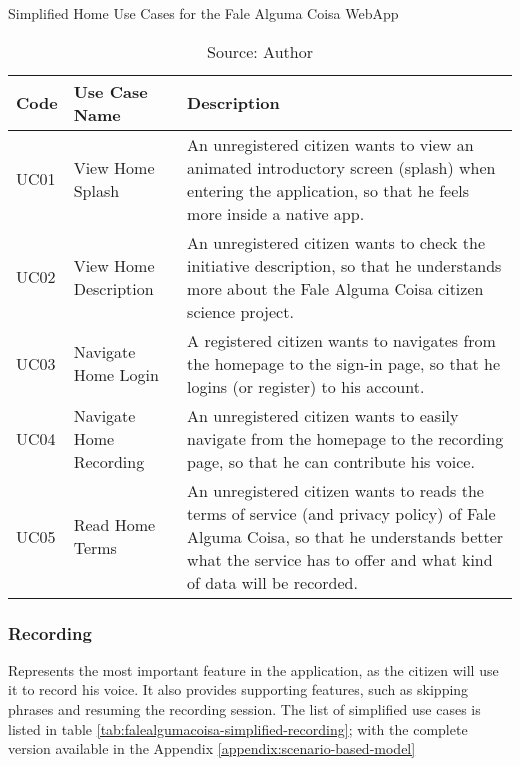 \begin{table}[h]
\caption{Simplified Home Use Cases for the Fale Alguma Coisa WebApp}
\label{tab:falealgumacoisa-simplified-home}
\centering
\begin{tabular}{|p{1cm}|p{3cm}|p{10cm}|}
\hline
    Code & Use Case Name & Description \\ \hline
    UC01 & View Home Splash & An unregistered citizen wants to view an animated introductory screen (splash) when entering the application, so that he feels more inside a native app. \\ \hline
    UC02 & View Home Description & An unregistered citizen wants to check the initiative description, so that he understands more about the Fale Alguma Coisa citizen science project. \\ \hline
    UC03 & Navigate Home Login & A registered citizen wants to navigates from the homepage to the sign-in page, so that he logins (or register) to his account. \\ \hline
    UC04 & Navigate Home Recording & An unregistered citizen wants to easily navigate from the homepage to the recording page, so that he can contribute his voice. \\ \hline
    UC05 & Read Home Terms & An unregistered citizen wants to reads the terms of service (and privacy policy) of Fale Alguma Coisa, so that he understands better what the service has to offer and what kind of data will be recorded. \\ \hline
\end{tabular}
\caption*{Source: Author}
\end{table}

\clearpage
\subsubsection{Recording}

Represents the most important feature in the application, as the citizen will use it to record his voice. It also provides supporting features, such as skipping phrases and resuming the recording session. The list of simplified use cases is listed in table \ref{tab:falealgumacoisa-simplified-recording}; with the complete version available in the Appendix \ref{appendix:scenario-based-model}

